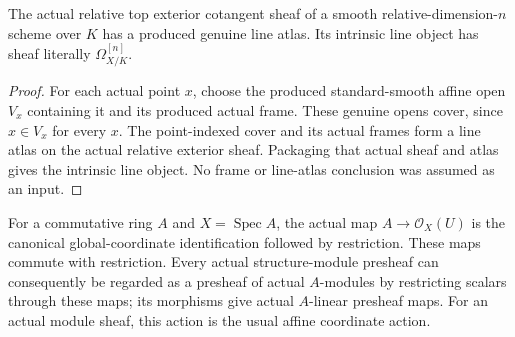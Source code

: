 \begin{theorem}
\label{sc0-canonical-port:can:actual-smooth-relative-exterior-line-atlas}
\leanok
The actual relative top exterior cotangent sheaf of a smooth
relative-dimension-\(n\) scheme over \(K\) has a produced genuine
line atlas. Its intrinsic line object has sheaf literally
\(\Omega_{X/K}^{[n]}\).
\end{theorem}
\begin{proof}
For each actual point \(x\), choose the produced standard-smooth
affine open \(V_x\) containing it and its produced actual frame.
These genuine opens cover, since \(x\in V_x\) for every \(x\).
The point-indexed cover and its actual frames form a line atlas
on the actual relative exterior sheaf. Packaging that actual sheaf
and atlas gives the intrinsic line object. No frame or line-atlas
conclusion was assumed as an input.
\end{proof}

\begin{definition}
\label{sc0-canonical-port:geom:affine-coordinate-scalar-actions}
\leanok
For a commutative ring \(A\) and \(X=\operatorname{Spec}A\),
the actual map \(A\to\mathcal O_X(U)\) is the canonical
global-coordinate identification followed by restriction.
These maps commute with restriction. Every actual structure-module
presheaf can consequently be regarded as a presheaf of actual
\(A\)-modules by restricting scalars through these maps;
its morphisms give actual \(A\)-linear presheaf maps.
For an actual module sheaf, this action is the usual affine
coordinate action.
\end{definition}

